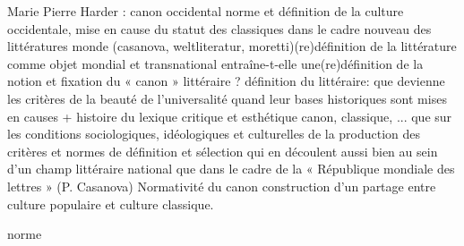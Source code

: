Marie Pierre Harder : canon occidental norme et définition de la culture occidentale, mise en cause du statut des classiques dans le cadre nouveau des littératures monde (casanova, weltliteratur, moretti)(re)définition de la littérature comme objet mondial et transnational entraîne-t-elle une(re)définition de la notion et fixation du « canon » littéraire ? définition du littéraire: que devienne les critères de la beauté de l'universalité quand leur bases historiques sont mises en causes + histoire du lexique critique et esthétique canon, classique, ... que sur les conditions sociologiques, idéologiques et culturelles de la production des critères et normes de définition et sélection qui en découlent aussi bien au sein d’un champ littéraire national que dans le cadre de la « République mondiale des lettres » (P. Casanova) Normativité du canon construction d'un partage entre culture populaire et culture classique.


norme 